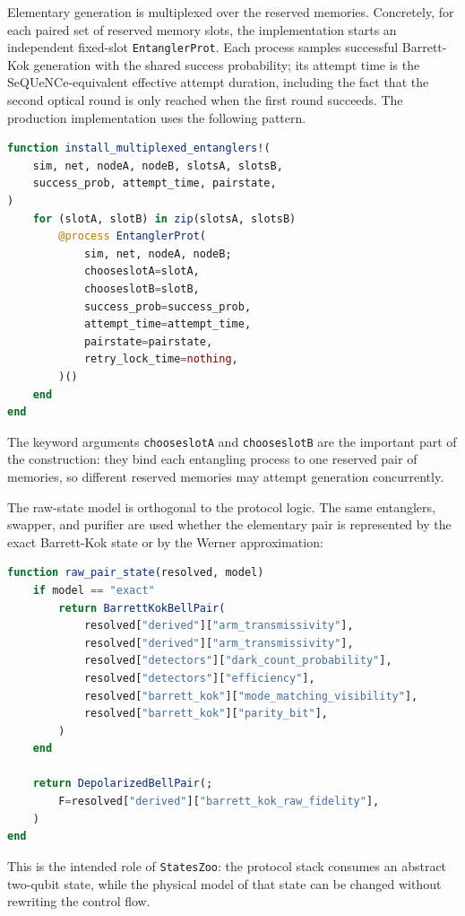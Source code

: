 Elementary generation is multiplexed over the reserved memories.  Concretely,
for each paired set of reserved memory slots, the implementation starts an
independent fixed-slot \texttt{EntanglerProt}.  Each process samples successful
Barrett-Kok generation with the shared success probability; its attempt time
is the SeQUeNCe-equivalent effective attempt duration, including the fact that
the second optical round is only reached when the first round succeeds.  The
production implementation uses the following pattern.
\begin{lstlisting}[language=Julia]
function install_multiplexed_entanglers!(
    sim, net, nodeA, nodeB, slotsA, slotsB,
    success_prob, attempt_time, pairstate,
)
    for (slotA, slotB) in zip(slotsA, slotsB)
        @process EntanglerProt(
            sim, net, nodeA, nodeB;
            chooseslotA=slotA,
            chooseslotB=slotB,
            success_prob=success_prob,
            attempt_time=attempt_time,
            pairstate=pairstate,
            retry_lock_time=nothing,
        )()
    end
end
\end{lstlisting}
The keyword arguments \texttt{chooseslotA} and \texttt{chooseslotB} are the
important part of the construction: they bind each entangling process to one
reserved pair of memories, so different reserved memories may attempt
generation concurrently.

The raw-state model is orthogonal to the protocol logic.  The same entanglers,
swapper, and purifier are used whether the elementary pair is represented by
the exact Barrett-Kok state or by the Werner approximation:
\begin{lstlisting}[language=Julia]
function raw_pair_state(resolved, model)
    if model == "exact"
        return BarrettKokBellPair(
            resolved["derived"]["arm_transmissivity"],
            resolved["derived"]["arm_transmissivity"],
            resolved["detectors"]["dark_count_probability"],
            resolved["detectors"]["efficiency"],
            resolved["barrett_kok"]["mode_matching_visibility"],
            resolved["barrett_kok"]["parity_bit"],
        )
    end

    return DepolarizedBellPair(;
        F=resolved["derived"]["barrett_kok_raw_fidelity"],
    )
end
\end{lstlisting}
This is the intended role of \texttt{StatesZoo}: the protocol stack consumes an
abstract two-qubit state, while the physical model of that state can be changed
without rewriting the control flow.

